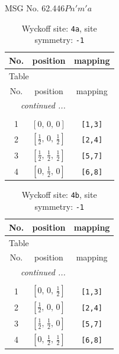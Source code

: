 \documentclass[fleqn,8pt]{jsarticle}
\begin{document}
\setcounter{MaxMatrixCols}{32}

\renewcommand{\tablename}{Table~}
\renewcommand{\figurename}{Figure~}
\begin{center}
\LARGE
MSG No. 62.446\quad$Pn'm'a$
\end{center}
\renewcommand{\arraystretch}{1.2}
\begin{longtable}{ccc}
\caption{Wyckoff site: {\tt 4a}, site symmetry: {\tt -1}}
 \\
 \hline \hline
No. & position & mapping \\ \hline \endfirsthead

\multicolumn{2}{l}{\tablename\ \thetable{}} \\
 \hline \hline
No. & position & mapping \\ \hline \endhead

 \hline \hline
\multicolumn{2}{r}{\footnotesize\it continued ...} \\ \endfoot

 \hline \hline
\multicolumn{2}{r}{} \\ \endlastfoot

1 & $\left[ 0,\, 0,\, 0 \right]$ & {\tt [1,3]} \\ \hline
2 & $\left[ \frac{1}{2},\, 0,\, \frac{1}{2} \right]$ & {\tt [2,4]} \\ \hline
3 & $\left[ \frac{1}{2},\, \frac{1}{2},\, \frac{1}{2} \right]$ & {\tt [5,7]} \\ \hline
4 & $\left[ 0,\, \frac{1}{2},\, 0 \right]$ & {\tt [6,8]} \\
\end{longtable}
\renewcommand{\arraystretch}{1.2}
\begin{longtable}{ccc}
\caption{Wyckoff site: {\tt 4b}, site symmetry: {\tt -1}}
 \\
 \hline \hline
No. & position & mapping \\ \hline \endfirsthead

\multicolumn{2}{l}{\tablename\ \thetable{}} \\
 \hline \hline
No. & position & mapping \\ \hline \endhead

 \hline \hline
\multicolumn{2}{r}{\footnotesize\it continued ...} \\ \endfoot

 \hline \hline
\multicolumn{2}{r}{} \\ \endlastfoot

1 & $\left[ 0,\, 0,\, \frac{1}{2} \right]$ & {\tt [1,3]} \\ \hline
2 & $\left[ \frac{1}{2},\, 0,\, 0 \right]$ & {\tt [2,4]} \\ \hline
3 & $\left[ \frac{1}{2},\, \frac{1}{2},\, 0 \right]$ & {\tt [5,7]} \\ \hline
4 & $\left[ 0,\, \frac{1}{2},\, \frac{1}{2} \right]$ & {\tt [6,8]} \\
\end{longtable}
\end{document}
